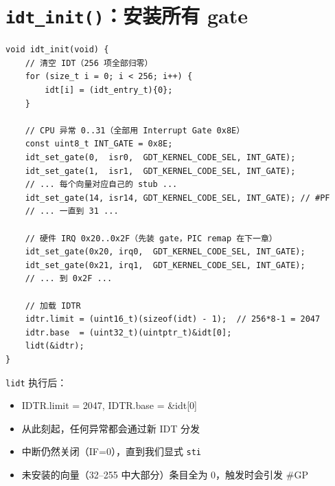 \section{\texttt{idt\_init()}：安装所有 gate}

\begin{lstlisting}[style=cstyle]
void idt_init(void) {
    // 清空 IDT（256 项全部归零）
    for (size_t i = 0; i < 256; i++) {
        idt[i] = (idt_entry_t){0};
    }

    // CPU 异常 0..31（全部用 Interrupt Gate 0x8E）
    const uint8_t INT_GATE = 0x8E;
    idt_set_gate(0,  isr0,  GDT_KERNEL_CODE_SEL, INT_GATE);
    idt_set_gate(1,  isr1,  GDT_KERNEL_CODE_SEL, INT_GATE);
    // ... 每个向量对应自己的 stub ...
    idt_set_gate(14, isr14, GDT_KERNEL_CODE_SEL, INT_GATE); // #PF
    // ... 一直到 31 ...

    // 硬件 IRQ 0x20..0x2F（先装 gate，PIC remap 在下一章）
    idt_set_gate(0x20, irq0,  GDT_KERNEL_CODE_SEL, INT_GATE);
    idt_set_gate(0x21, irq1,  GDT_KERNEL_CODE_SEL, INT_GATE);
    // ... 到 0x2F ...

    // 加载 IDTR
    idtr.limit = (uint16_t)(sizeof(idt) - 1);  // 256*8-1 = 2047
    idtr.base  = (uint32_t)(uintptr_t)&idt[0];
    lidt(&idtr);
}
\end{lstlisting}

\begin{cpustate}
\texttt{lidt} 执行后：
\begin{itemize}
  \item IDTR.limit = 2047, IDTR.base = \&idt[0]
  \item 从此刻起，任何异常都会通过新 IDT 分发
  \item 中断仍然关闭（IF=0），直到我们显式 \texttt{sti}
  \item 未安装的向量（32--255 中大部分）条目全为 0，触发时会引发 \#GP
\end{itemize}
\end{cpustate}


